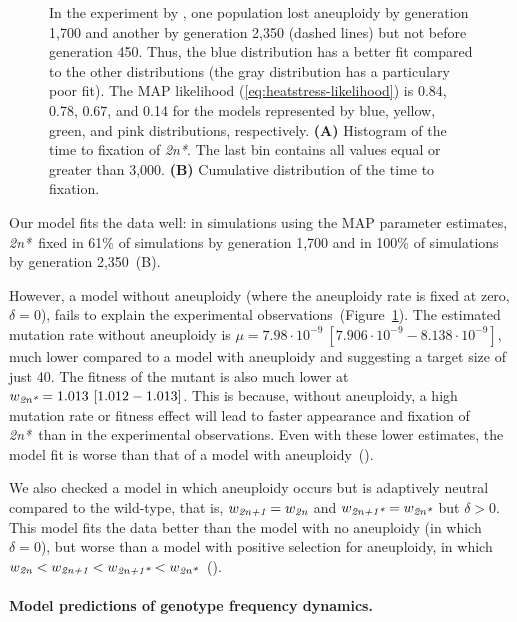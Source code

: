 \documentclass[12pt]{extarticle}
\newcommand{\euwt}{\emph{2n}}
\newcommand{\anwt}{\emph{2n+1}}
\newcommand{\eumt}{\emph{2n*}}
\newcommand{\anmt}{\emph{2n+1*}}
\begin{document}
\begin{figure}[h!]
{In the experiment by \citet{Yona2012}, one population lost aneuploidy by generation 1,700 and another by generation 2,350 (dashed lines) but not before generation 450.
Thus, the blue distribution has a better fit compared to the other distributions (the gray distribution has a particulary poor fit).
The MAP likelihood (\cref{eq:heatstress-likelihood}) is 0.84, 0.78, 0.67, and 0.14 for the models represented by blue, yellow, green, and pink distributions, respectively. 
\textbf{(A)} Histogram of the time to fixation of \eumt. The last bin contains all values equal or greater than 3,000.
\textbf{(B)} Cumulative distribution of the time to fixation. 
     }
  \label{fig:2n*-fixation}
\end{figure}


Our model fits the data well: in simulations using the MAP parameter estimates, \eumt\ fixed in 61\% of simulations by generation 1,700 and in 100\% of simulations by generation 2,350~(B).
 
However, a model without aneuploidy (where the aneuploidy rate is fixed at zero, $\delta=0$), fails to explain the experimental observations~(Figure~\ref{fig:2n*-fixation}). %
The estimated mutation rate without aneuploidy is $\mu=7.98\cdot10^{-9}\ [7.906\cdot10^{-9}-8.138\cdot10^{-9}]$, much lower compared to a model with aneuploidy and suggesting a target size of just 40. 
The fitness of the mutant is also much lower at $w_{\eumt}=1.013\ [1.012-1.013]$.
This is because, without aneuploidy, a high mutation rate or fitness effect will lead to faster appearance and fixation of \eumt\ than in the experimental observations. Even with these lower estimates, the model fit is worse than that of a model with aneuploidy~(). 

We also checked a model in which aneuploidy occurs but is adaptively neutral compared to the wild-type, that is, $w_{\anwt} = w_{\euwt}$ and $w_{\anmt} = w_{\eumt}$ but $\delta>0$. This model fits the data better than the model with no aneuploidy (in which $\delta=0$), but worse than a model with positive selection for aneuploidy, in which $w_{\euwt}<w_{\anwt}<w_{\anmt}<w_{\eumt}$~(). 


\paragraph{Model predictions of genotype frequency dynamics.}
\end{document}
